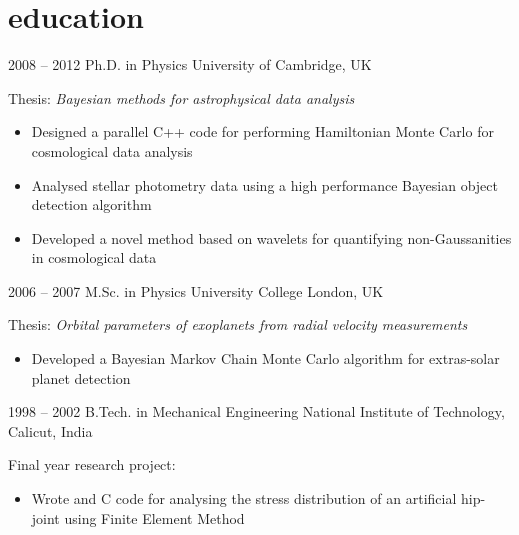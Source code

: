 \documentclass[]{friggeri-cv}
\begin{document}
    \section{education}
        \begin{entrylist}
            \entry
            {2008 -- 2012}
            {Ph.D. {\normalfont in Physics}}
            {University of Cambridge, UK}
            {Thesis: \emph{Bayesian methods for astrophysical data analysis}
                \begin{itemize}
                    \item Designed a parallel C++ code for performing Hamiltonian Monte Carlo for cosmological data analysis
                    \item Analysed stellar photometry data using a high performance Bayesian object detection algorithm
                    \item Developed a novel method based on wavelets for quantifying non-Gaussanities in cosmological data
                \end{itemize}
            }
            \entry
            {2006 -- 2007}
            {M.Sc. {\normalfont in Physics}}
            {University College London, UK}
            {Thesis: \emph{Orbital parameters of exoplanets from radial velocity measurements}
                \begin{itemize}
                    \item Developed a Bayesian Markov Chain Monte Carlo algorithm for extras-solar planet detection
                \end{itemize}
            }
            \entry
            {1998 -- 2002}
            {B.Tech. {\normalfont in Mechanical Engineering}}
            {National Institute of Technology, Calicut, India}
            {Final year research project:
            \begin{itemize}
                \item Wrote and C code for analysing the stress distribution of an artificial hip-joint using Finite Element Method
            \end{itemize}}
        \end{entrylist}
\end{document}

